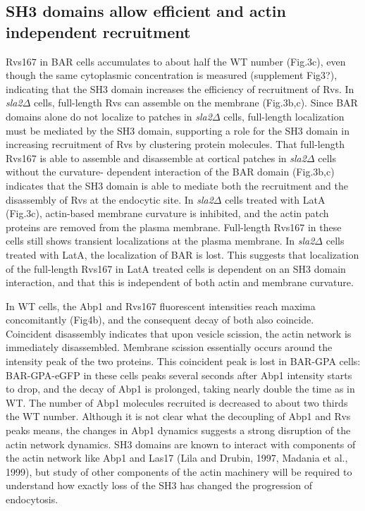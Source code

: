 \documentclass[9pt,lineno]{elife}
\begin{document}
\subsection{SH3 domains allow efficient and actin independent recruitment}

Rvs167 in BAR cells accumulates to about half the WT number (Fig.3c), even though the same cytoplasmic concentration is measured (supplement Fig3?), indicating that the SH3 domain increases the efficiency of recruitment of Rvs.  In \textit{sla2$\Delta$} cells, full-length Rvs can assemble on the membrane (Fig.3b,c). Since BAR domains alone do not localize to patches in \textit{sla2$\Delta$} cells, full-length localization must be mediated by the SH3 domain, supporting a role for the SH3 domain in increasing recruitment of Rvs by clustering protein molecules. That full-length Rvs167 is able to assemble and disassemble at cortical patches in \textit{sla2$\Delta$} cells without the curvature- dependent interaction of the BAR domain (Fig.3b,c) indicates that the SH3 domain is able to mediate both the recruitment and the disassembly of Rvs at the endocytic site. In \textit{sla2$\Delta$} cells treated with LatA (Fig.3c), actin-based membrane curvature is inhibited, and the actin patch proteins are removed from the plasma membrane. Full-length Rvs167 in these cells still shows transient localizations at the plasma membrane. In \textit{sla2$\Delta$} cells treated with LatA, the localization of BAR is lost. This suggests that localization of the full-length Rvs167 in LatA treated cells is dependent on an SH3 domain interaction, and that this is independent of both actin and membrane curvature.

In WT cells, the Abp1 and Rvs167 fluorescent intensities reach maxima concomitantly (Fig4b), and the consequent decay of both also coincide. Coincident disassembly indicates that upon vesicle scission, the actin network is immediately disassembled. Membrane scission essentially occurs around the intensity peak of the two proteins. This coincident peak is lost in BAR-GPA cells: BAR-GPA-eGFP in these cells peaks several seconds after Abp1 intensity starts to drop, and the decay of Abp1 is prolonged, taking nearly double the time as in WT. The number of Abp1 molecules recruited is decreased to about two thirds the WT number. Although it is not clear what the decoupling of Abp1 and Rvs peaks means, the changes in Abp1 dynamics suggests a strong disruption of the actin network dynamics. SH3 domains are known to interact with components of the actin network like Abp1 and Las17 (Lila and Drubin, 1997, Madania et al., 1999), but study of other components of the actin machinery will be required to understand how exactly loss of the SH3 has changed the progression of endocytosis.
\end{document}
